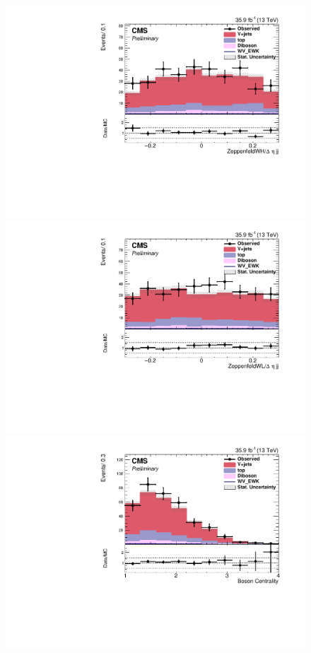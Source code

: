 \begin{figure}[htb]
\includegraphics[width=\cmsFigWidth]{Plots/plots/DibosonBoostedElMuCuts13TeV_WjetControlRegion_Tighter_CHS_ZeppenfeldWH_new.pdf}
\includegraphics[width=\cmsFigWidth]{Plots/plots/DibosonBoostedElMuCuts13TeV_WjetControlRegion_Tighter_CHS_ZeppenfeldWL_type0_new.pdf}
\includegraphics[width=\cmsFigWidth]{Plots/plots/DibosonBoostedElMuCuts13TeV_WjetControlRegion_Tighter_CHS_BosonCentrality_type0.pdf}

\end{figure}
